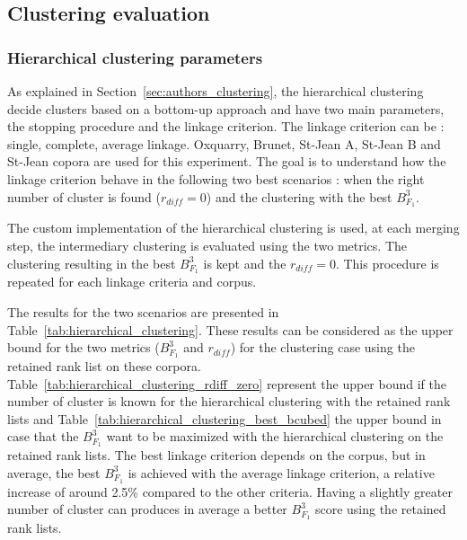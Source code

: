 \subsection{Clustering evaluation}

\subsubsection{Hierarchical clustering parameters}

As explained in Section~\ref{sec:authors_clustering}, the hierarchical clustering decide clusters based on a bottom-up approach and have two main parameters, the stopping procedure and the linkage criterion.
The linkage criterion can be : single, complete, average linkage.
Oxquarry, Brunet, St-Jean A, St-Jean B and St-Jean copora are used for this experiment.
The goal is to understand how the linkage criterion behave in the following two best scenarios : when the right number of cluster is found ($r_{diff} = 0$) and the clustering with the best $B^3_{F_1}$.

The custom implementation of the hierarchical clustering is used, at each merging step, the intermediary clustering is evaluated using the two metrics.
The clustering resulting in the best $B^3_{F_1}$ is kept and the $r_{diff} = 0$.
This procedure is repeated for each linkage criteria and corpus.

The results for the two scenarios are presented in Table~\ref{tab:hierarchical_clustering}.
These results can be considered as the upper bound for the two metrics ($B^3_{F_1}$ and $r_{diff}$) for the clustering case using the retained rank list on these corpora.
Table~\ref{tab:hierarchical_clustering_rdiff_zero} represent the upper bound if the number of cluster is known for the hierarchical clustering with the retained rank lists and Table~\ref{tab:hierarchical_clustering_best_bcubed} the upper bound in case that the $B^3_{F_1}$ want to be maximized with the hierarchical clustering on the retained rank lists.
The best linkage criterion depends on the corpus, but in average, the best $B^3_{F_1}$ is achieved with the average linkage criterion, a relative increase of around 2.5\% compared to the other criteria.
Having a slightly greater number of cluster can produces in average a better $B^3_{F_1}$ score using the retained rank lists.


